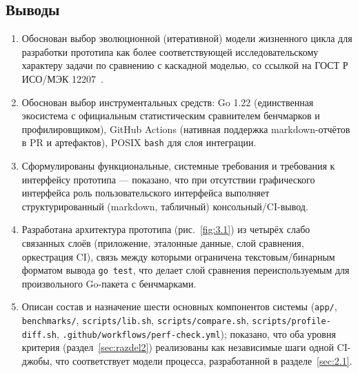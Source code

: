 \subsection{Выводы}

\begin{enumerate}
\item Обоснован выбор эволюционной (итеративной) модели жизненного цикла
для разработки прототипа как более соответствующей исследовательскому
характеру задачи по сравнению с каскадной моделью, со ссылкой на
ГОСТ Р ИСО/МЭК 12207~\cite{gost12207}.
\item Обоснован выбор инструментальных средств: Go 1.22 (единственная
экосистема с официальным статистическим сравнителем бенчмарков и
профилировщиком), GitHub Actions (нативная поддержка markdown-отчётов в PR
и артефактов), POSIX \texttt{bash} для слоя интеграции.
\item Сформулированы функциональные, системные требования и требования к
интерфейсу прототипа — показано, что при отсутствии графического
интерфейса роль пользовательского интерфейса выполняет
структурированный (markdown, табличный) консольный/CI-вывод.
\item Разработана архитектура прототипа (рис.~\ref{fig:3.1}) из четырёх
слабо связанных слоёв (приложение, эталонные данные, слой сравнения,
оркестрация CI), связь между которыми ограничена текстовым/бинарным
форматом вывода \texttt{go test}, что делает слой сравнения переиспользуемым
для произвольного Go-пакета с бенчмарками.
\item Описан состав и назначение шести основных компонентов системы
(\texttt{app/\allowbreak }, \texttt{benchmarks/\allowbreak }, \texttt{scripts/\allowbreak lib.sh},
\texttt{scripts/\allowbreak compare.sh}, \texttt{scripts/\allowbreak profile-diff.sh},
\texttt{.github/\allowbreak workflows/\allowbreak perf-check.yml}); показано, что оба уровня
критерия (раздел~\ref{sec:razdel2}) реализованы как независимые шаги одной
CI-джобы, что соответствует модели процесса, разработанной в
разделе~\ref{sec:2.1}.
\end{enumerate}
